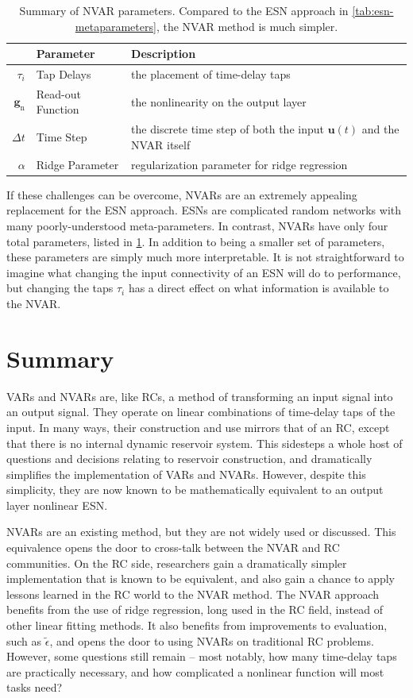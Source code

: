 \begin{table}
  \caption{Summary of NVAR parameters. Compared to the ESN approach in
    \cref{tab:esn-metaparameters}, the NVAR method is much simpler.}
  \begin{tabularx}{\linewidth}{rlX}
    & Parameter & Description \\
    \hline
    \rule{0pt}{4ex}
    $\tau_i$ & Tap Delays & the placement of time-delay taps \\
    \rule{0pt}{4ex}
    $\bm{g}_\text{n}$ & Read-out Function & the nonlinearity on the output layer \\
    \rule{0pt}{4ex}
    $\Delta t$ & Time Step & the discrete time step of both the input $\bm{u}(t)$ and the NVAR itself \\
    \rule{0pt}{4ex}
    $\alpha$ & Ridge Parameter & regularization parameter for ridge regression \\
  \end{tabularx}
  \label{tab:nvar-parameters}
\end{table}

If these challenges can be overcome, NVARs are an extremely appealing
replacement for the ESN approach. ESNs are complicated random networks
with many poorly-understood meta-parameters. In contrast, NVARs have
only four total parameters, listed in \cref{tab:nvar-parameters}.  In
addition to being a smaller set of parameters, these parameters are
simply much more interpretable. It is not straightforward to imagine
what changing the input connectivity of an ESN will do to performance,
but changing the taps $\tau_i$ has a direct effect on what information
is available to the NVAR.

\section{Summary}

VARs and NVARs are, like RCs, a method of transforming an input signal
into an output signal. They operate on linear combinations of
time-delay taps of the input. In many ways, their construction and use
mirrors that of an RC, except that there is no internal dynamic
reservoir system. This sidesteps a whole host of questions and
decisions relating to reservoir construction, and dramatically
simplifies the implementation of VARs and NVARs. However, despite this
simplicity, they are now known to be mathematically equivalent to an
output layer nonlinear ESN.

NVARs are an existing method, but they are not widely used or discussed. This equivalence opens the door
to cross-talk between the NVAR and RC communities. On the RC side,
researchers gain a dramatically simpler implementation that is known
to be equivalent, and also gain a chance to apply lessons learned in
the RC world to the NVAR method. The NVAR approach benefits from the
use of ridge regression, long used in the RC field, instead of other
linear fitting methods.  It also benefits from improvements to
evaluation, such as $\tilde{\epsilon}$, and opens the door to using
NVARs on traditional RC problems. However, some questions still
remain -- most notably, how many time-delay taps are practically
necessary, and how complicated a nonlinear function will most tasks
need?

